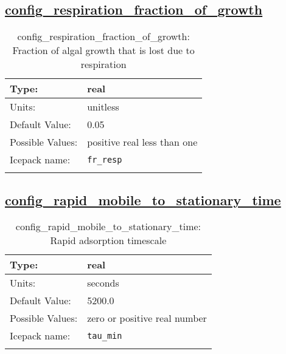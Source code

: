 \subsection[config\_respiration\_fraction\_of\_growth]{\hyperref[sec:nm_tab_biogeochemistry]{config\_respiration\_fraction\_of\_growth}}
\label{subsec:nm_sec_config_respiration_fraction_of_growth}
\begin{center}
\begin{longtable}{| p{2.0in} || p{4.0in} |}
    \hline
    Type: & real \\
    \hline
    Units: & \si{unitless} \\
    \hline
    Default Value: & 0.05 \\
    \hline
    Possible Values: & positive real less than one \\
    \hline
    \hline
    Icepack name: & \verb+fr_resp+ \\
    \caption{config\_respiration\_fraction\_of\_growth: Fraction of algal growth that is lost due to respiration}
\end{longtable}
\end{center}
\subsection[config\_rapid\_mobile\_to\_stationary\_time]{\hyperref[sec:nm_tab_biogeochemistry]{config\_rapid\_mobile\_to\_stationary\_time}}
\label{subsec:nm_sec_config_rapid_mobile_to_stationary_time}
\begin{center}
\begin{longtable}{| p{2.0in} || p{4.0in} |}
    \hline
    Type: & real \\
    \hline
    Units: & \si{seconds} \\
    \hline
    Default Value: & 5200.0 \\
    \hline
    Possible Values: & zero or positive real number \\
    \hline
    \hline
    Icepack name: & \verb+tau_min+ \\
    \caption{config\_rapid\_mobile\_to\_stationary\_time: Rapid adsorption timescale  }
\end{longtable}
\end{center}
